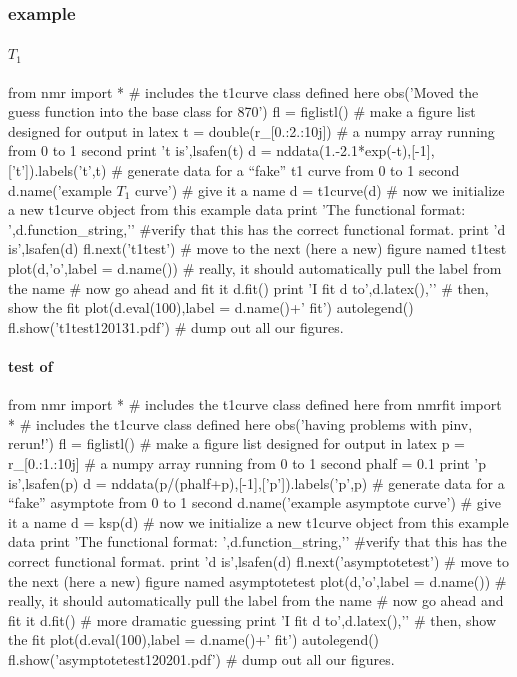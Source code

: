 \subsubsection{example}\label{sec:writeup_software_fitfunc_thingstouse_example}

\paragraph{$T_1$}
\begin{python}
from nmr import * # includes the t1curve class defined here
obs('Moved the guess function into the base class for 870')
fl = figlistl() # make a figure list designed for output in latex
t = double(r_[0.:2.:10j]) # a numpy array running from 0 to 1 second
print 't is',lsafen(t)
d = nddata(1.-2.1*exp(-t),[-1],['t']).labels('t',t) # generate data for a ``fake'' t1 curve from 0 to 1 second
d.name('example $T_1$ curve') # give it a name
d = t1curve(d) # now we initialize a new t1curve object from this example data
print 'The functional format: ',d.function_string,'\n\n' #verify that this has the correct functional format.
print 'd is',lsafen(d)
fl.next('t1test') # move to the next (here a new) figure named t1test
plot(d,'o',label = d.name()) # really, it should automatically pull the label from the name
# now go ahead and fit it
d.fit()
print 'I fit d to',d.latex(),'\n\n'
# then, show the fit
plot(d.eval(100),label = d.name()+' fit')
autolegend()
fl.show('t1test120131.pdf') # dump out all our figures.
\end{python}
\paragraph{test of \ksp}\label{sec:random_testofksp}

\begin{python}
from nmr import * # includes the t1curve class defined here
from nmrfit import * # includes the t1curve class defined here
obs('having problems with pinv, rerun!')
fl = figlistl() # make a figure list designed for output in latex
p = r_[0.:1.:10j] # a numpy array running from 0 to 1 second
phalf = 0.1
print 'p is',lsafen(p)
d = nddata(p/(phalf+p),[-1],['p']).labels('p',p) # generate data for a ``fake'' asymptote from 0 to 1 second
d.name('example asymptote curve') # give it a name
d = ksp(d) # now we initialize a new t1curve object from this example data
print 'The functional format: ',d.function_string,'\n\n' #verify that this has the correct functional format.
print 'd is',lsafen(d)
fl.next('asymptotetest') # move to the next (here a new) figure named asymptotetest
plot(d,'o',label = d.name()) # really, it should automatically pull the label from the name
# now go ahead and fit it
d.fit() # more dramatic guessing
print 'I fit d to',d.latex(),'\n\n'
# then, show the fit
plot(d.eval(100),label = d.name()+' fit')
autolegend()
fl.show('asymptotetest120201.pdf') # dump out all our figures.
\end{python}
